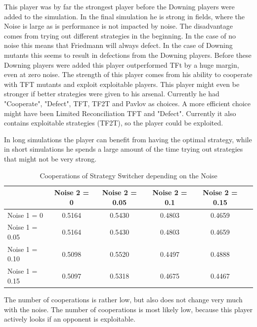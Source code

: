 \documentclass[11pt,twoside]{article}
\begin{document}
This player was by far the strongest player before the Downing players were added to the simulation. In the final simulation he is strong in fields, where the Noise is large as is performance is not impacted by noise. The disadvantage comes from trying out different strategies in the beginning. In the case of no noise this means that Friedmann will always defect. In the case of Downing mutants this seems to result in defections from the Downing players. Before these Downing players were added this player outperformed TFt by a huge margin, even at zero noise. The strength of this player comes from his ability to cooperate with TFT mutants and exploit exploitable players. This player might even be stronger if better strategies were given to his arsenal. Currently he had "Cooperate", "Defect", TFT, TF2T and Pavlov as choices. A more efficient choice might have been Limited Reconciliation TFT and "Defect". Currently it also contains exploitable strategies (TF2T), so the player could be exploited.

In long simulations the player can benefit from having the optimal strategy, while in short simulations he spends a large amount of the time trying out strategies that might not be very strong.

\begin{table}[h]
 \begin{center}
\caption{Cooperations of Strategy Switcher depending on the Noise} \vspace{3mm}
\begin{tabular}{|l|c|c|c|c|c|}
\hline
   	& Noise 2 = 0 & Noise 2 = 0.05& Noise 2 = 0.1& Noise 2 = 0.15 \\
  \hline
  Noise 1 = 0 	&     0.5164 &   0.5430  &  0.4803  &  0.4659 \\
 \hline
  Noise 1 = 0.05	 &    0.5164  &  0.5430   & 0.4803   & 0.4659 \\
 \hline
  Noise 1 = 0.10 	&    0.5098  &  0.5520  &  0.4497 &   0.4888 \\
 \hline
  Noise 1 = 0.15 	&        0.5097  &  0.5318 &   0.4675 &   0.4467 \\
 \hline
\end{tabular}
 \end{center}
\end{table}

The number of cooperations is rather low, but also does not change very much with the noise. The number of cooperations is most likely low, because this player actively looks if an opponent is exploitable.
\end{document}
